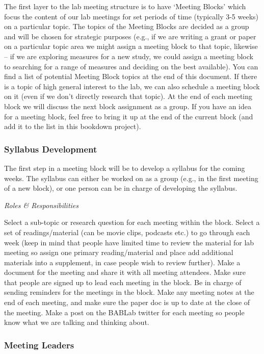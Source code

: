 \documentclass[]{book}
\begin{document}
The first layer to the lab meeting structure is to have `Meeting Blocks' which focus the content of our lab meetings for set periods of time (typically 3-5 weeks) on a particular topic. The topics of the Meeting Blocks are decided as a group and will be chosen for strategic purposes (e.g., if we are writing a grant or paper on a particular topic area we might assign a meeting block to that topic, likewise -- if we are exploring measures for a new study, we could assign a meeting block to searching for a range of measures and deciding on the best available). You can find a list of potential Meeting Block topics at the end of this document. If there is a topic of high general interest to the lab, we can also schedule a meeting block on it (even if we don't directly research that topic). At the end of each meeting block we will discuss the next block assignment as a group. If you have an idea for a meeting block, feel free to bring it up at the end of the current block (and add it to the list in this bookdown project).

\hypertarget{syllabus-development}{%
\subsubsection{Syllabus Development}\label{syllabus-development}}

The first step in a meeting block will be to develop a syllabus for the coming weeks. The syllabus can either be worked on as a group (e.g., in the first meeting of a new block), or one person can be in charge of developing the syllabus.

\emph{Roles \& Responsibilities}

Select a sub-topic or research question for each meeting within the block.
Select a set of readings/material (can be movie clips, podcasts etc.) to go through each week (keep in mind that people have limited time to review the material for lab meeting so assign one primary reading/material and place add additional materials into a supplement, in case people wish to review further).
Make a document for the meeting and share it with all meeting attendees.
Make sure that people are signed up to lead each meeting in the block.
Be in charge of sending reminders for the meetings in the block.
Make any meeting notes at the end of each meeting, and make sure the paper doc is up to date at the close of the meeting.
Make a post on the BABLab twitter for each meeting so people know what we are talking and thinking about.

\hypertarget{meeting-leaders}{%
\subsubsection{Meeting Leaders}\label{meeting-leaders}}
\end{document}
